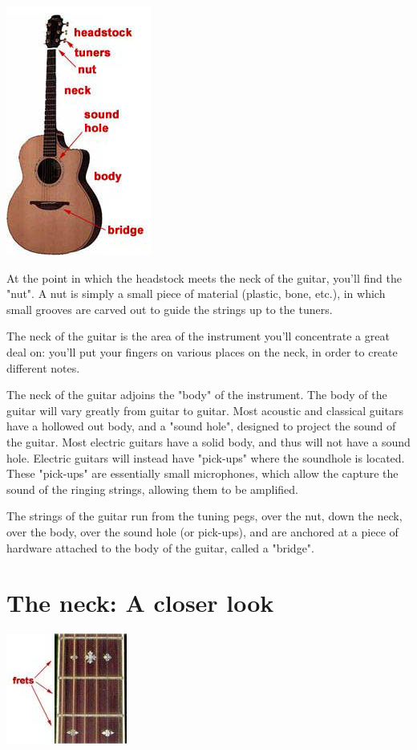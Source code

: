 \includegraphics{partone/partsofaguitar.jpg}

At the point in which the headstock meets the neck of the guitar, you'll find
the "nut". A nut is simply a small piece of material (plastic, bone, etc.), in
which small grooves are carved out to guide the strings up to the tuners.

The neck of the guitar is the area of the instrument you'll concentrate a great
deal on: you'll put your fingers on various places on the neck, in order to
create different notes.

The neck of the guitar adjoins the "body" of the instrument. The body of the
guitar will vary greatly from guitar to guitar. Most acoustic and classical
guitars have a hollowed out body, and a "sound hole", designed to project the
sound of the guitar. Most electric guitars have a solid body, and thus will not
have a sound hole. Electric guitars will instead have "pick-ups" where the
soundhole is located. These "pick-ups" are essentially small microphones, which
allow the capture the sound of the ringing strings, allowing them to be
amplified.

The strings of the guitar run from the tuning pegs, over the nut, down the
neck, over the body, over the sound hole (or pick-ups), and are anchored at a
piece of hardware attached to the body of the guitar, called a "bridge". 

\section{The neck: A closer look}
\includegraphics{partone/frets.jpg}

